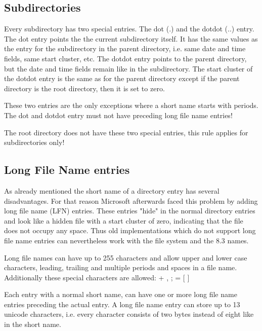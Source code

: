 \subsection{Subdirectories}

Every subdirectory has two special entries. The dot (.) and the dotdot (..) entry. The dot entry points the the current subdirectory itself. It has the same values as the entry for the subdirectory in the parent directory, i.e. same date and time fields, same start cluster, etc. The dotdot entry points to the parent directory, but the date and time fields remain like in the subdirectory. The start cluster of the dotdot entry is the same as for the parent directory except if the parent directory is the root directory, then it is set to zero\cite{fatgen103}.

These two entries are the only exceptions where a short name starts with periods. The dot and dotdot entry must not have preceding long file name entries\cite{fatgen103}!

The root directory does not have these two special entries, this rule applies for subdirectories only\cite{fatgen103}!

\subsection{Long File Name entries}

As already mentioned the short name of a directory entry has several disadvantages. For that reason Microsoft afterwards faced this problem by adding long file name (LFN) entries. These entries "hide" in the normal directory entries and look like a hidden file with a start cluster of zero, indicating that the file does not occupy any space. Thus old implementations which do not support long file name entries can nevertheless work with the file system and the 8.3 names.

Long file names can have up to 255 characters and allow upper and lower case characters, leading, trailing and multiple periods and spaces in a file name\cite{usb_ms_jan}. Additionally these special characters are allowed\cite{fatgen103}: + , ; = [ ] 

Each entry with a normal short name, can have one or more long file name entries preceding the actual entry. A long file name entry can store up to 13 unicode characters, i.e. every character consists of two bytes instead of eight like in the short name.

